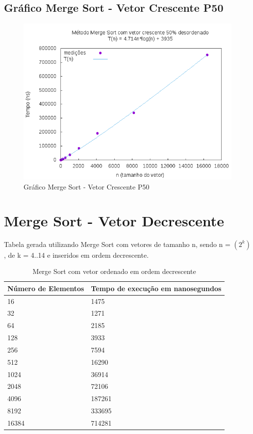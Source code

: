 \documentclass[12pt,a4paper,twoside]{report}
\begin{document}
\subsection{Gráfico Merge Sort - Vetor Crescente P50}
\begin{figure}[H]
    \centering
    \includegraphics[width=0.7\linewidth]{graficos/MergeSort/vIntCrescenteP50/vIntCrescenteP50.png}
  \caption{Gráfico Merge Sort - Vetor Crescente P50}
\end{figure}

\section{Merge Sort - Vetor Decrescente}
Tabela gerada utilizando Merge Sort com vetores de tamanho n, sendo n = $(2^k)$, de k = 4..14 e inseridos em ordem decrescente.
\begin{table}[H]
\centering
\caption{Merge Sort com vetor ordenado em ordem decrescente}
\label{my-label}
\begin{tabular}{|l|l|}
\hline
\multicolumn{1}{|c|}{\textbf{Número de Elementos}} & \multicolumn{1}{c|}{\textbf{Tempo de execução em nanosegundos}} \\ \hline
16 & 1475 \\ \hline
32 & 1271 \\ \hline
64 & 2185 \\ \hline
128 & 3933 \\ \hline
256 & 7594 \\ \hline
512 & 16290 \\ \hline
1024 & 36914 \\ \hline
2048 & 72106 \\ \hline
4096 & 187261 \\ \hline
8192 & 333695 \\ \hline
16384 & 714281 \\ \hline
\end{tabular}
\end{table}
\end{document}
